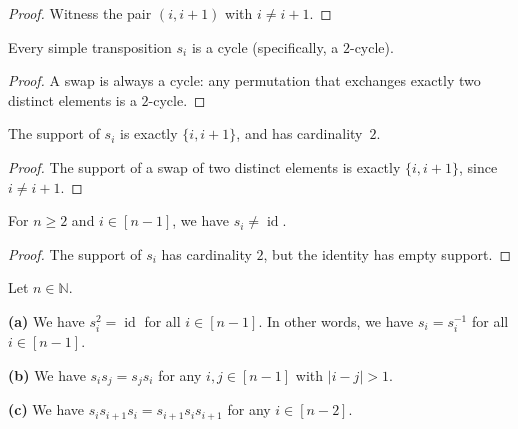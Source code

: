 \begin{proof}
\leanok
Witness the pair $(i, i+1)$ with $i \ne i+1$.
\end{proof}

\begin{lemma}
\label{lem.perm.si.isCycle}
\leanhelper
\leanok
Every simple transposition $s_i$ is a cycle (specifically, a $2$-cycle).
\end{lemma}

\begin{proof}
\leanok
A swap is always a cycle: any permutation that exchanges exactly two distinct elements is a $2$-cycle.
\end{proof}

\begin{lemma}
\label{lem.perm.si.support}
\leanhelper
\leanok
The support of $s_i$ is exactly $\{i, i+1\}$, and has cardinality~$2$.
\end{lemma}

\begin{proof}
\leanok
The support of a swap of two distinct elements is exactly $\{i, i+1\}$, since $i \ne i+1$.
\end{proof}

\begin{lemma}
\label{lem.perm.si.ne_one}
\leanhelper
\leanok
For $n \ge 2$ and $i \in [n-1]$, we have $s_i \ne \operatorname{id}$.
\end{lemma}

\begin{proof}
\leanok
The support of $s_i$ has cardinality $2$, but the identity has empty support.
\end{proof}

\begin{proposition}
\label{prop.perm.si.rules}
\leantarget
\leanok
Let $n \in \mathbb{N}$.

\textbf{(a)} We have $s_i^2 = \operatorname{id}$ for all $i \in [n-1]$.
In other words, we have $s_i = s_i^{-1}$ for all $i \in [n-1]$.

\textbf{(b)} We have $s_i s_j = s_j s_i$ for any $i, j \in [n-1]$ with
$|i - j| > 1$.

\textbf{(c)} We have $s_i s_{i+1} s_i = s_{i+1} s_i s_{i+1}$ for any
$i \in [n-2]$.
\end{proposition}

